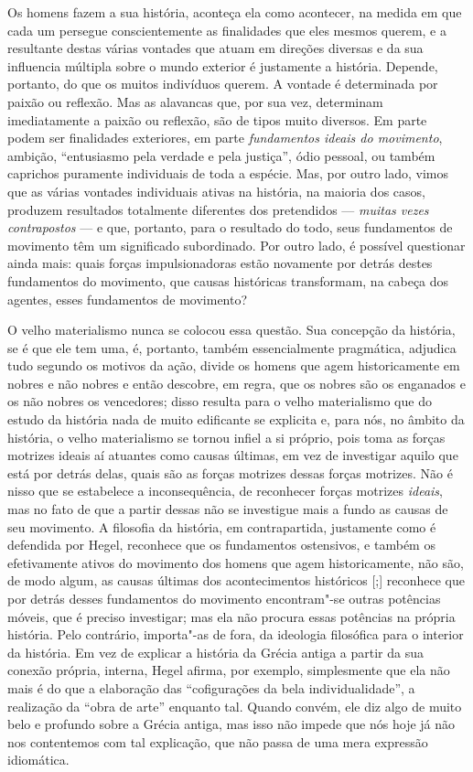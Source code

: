 Os homens fazem a sua história, aconteça ela como acontecer, na medida
em que cada um persegue conscientemente as finalidades que eles mesmos %
querem, e a resultante destas várias vontades que atuam em direções
diversas e da sua influencia múltipla sobre o mundo exterior é
justamente a história. Depende, portanto, do que os muitos indivíduos
querem. A vontade é determinada por paixão ou reflexão. Mas as alavancas
que, por sua vez, determinam imediatamente a paixão ou reflexão, são de
tipos muito diversos. Em parte podem ser finalidades exteriores, em
parte \emph{fundamentos ideais do movimento}, 
ambição, ``entusiasmo pela verdade e pela justiça'', ódio
pessoal, ou também caprichos puramente individuais de toda a espécie.
Mas, por outro lado, vimos que as várias vontades individuais ativas na
história, na maioria dos casos, produzem resultados totalmente
diferentes dos pretendidos --- \emph{muitas vezes contrapostos} --- e que,
portanto, para o resultado do todo, seus fundamentos de movimento têm um
significado subordinado. Por outro lado, é possível questionar ainda
mais: quais forças impulsionadoras estão novamente por detrás destes
fundamentos do movimento, que causas históricas transformam, na cabeça
dos agentes, esses fundamentos de movimento?

O velho materialismo nunca se colocou essa questão. Sua concepção da
história, se é que ele tem uma, é, portanto, também essencialmente
pragmática, adjudica tudo segundo os motivos da ação, divide os homens
que agem historicamente em nobres e não nobres e então descobre, em
regra, que os nobres são os enganados e os não
nobres os vencedores; disso resulta para o velho materialismo que do
estudo da história nada de muito edificante se explicita e, para nós, no
âmbito da história, o velho materialismo se tornou infiel a si próprio,
pois toma as forças motrizes ideais aí atuantes como causas últimas, em
vez de investigar aquilo que está por detrás delas, quais são as forças
motrizes dessas forças motrizes. Não é nisso que se estabelece a
inconsequência, de reconhecer forças motrizes \emph{ideais}, mas no fato
de que a partir dessas não se investigue mais a fundo as causas de seu
movimento. A filosofia da história, em contrapartida, justamente como é
defendida
por Hegel,
reconhece que os fundamentos ostensivos, e também os efetivamente ativos
do movimento dos homens que agem historicamente, não são, de modo algum,
as causas últimas dos acontecimentos históricos {[};{]} reconhece que
por detrás desses fundamentos do movimento encontram"-se outras potências
móveis, que é preciso investigar; mas ela não procura 
essas potências na própria história. Pelo contrário, importa"-as de
fora, da ideologia filosófica para o interior da história. Em vez de
explicar a história da Grécia antiga a partir da sua conexão própria,
interna, Hegel afirma,
por exemplo, simplesmente que ela não mais é do que a elaboração das
``cofigurações da bela individualidade'', a realização da ``obra de
arte'' enquanto tal. Quando convém, ele diz algo de muito belo e
profundo sobre a Grécia antiga, mas isso não impede que nós hoje já não
nos contentemos com tal explicação, que não passa de uma mera expressão
idiomática.

